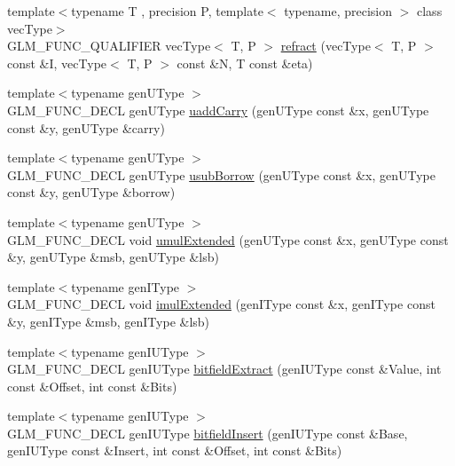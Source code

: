 \begin{DoxyCompactItemize}
\item 
{\footnotesize template$<$typename T , precision P, template$<$ typename, precision $>$ class vec\-Type$>$ }\\G\-L\-M\-\_\-\-F\-U\-N\-C\-\_\-\-Q\-U\-A\-L\-I\-F\-I\-E\-R vec\-Type$<$ T, P $>$ \hyperlink{group__core__func__geometric_ga99d8ddb244b129892babaca9778206d0}{refract} (vec\-Type$<$ T, P $>$ const \&I, vec\-Type$<$ T, P $>$ const \&N, T const \&eta)
\item 
{\footnotesize template$<$typename gen\-U\-Type $>$ }\\G\-L\-M\-\_\-\-F\-U\-N\-C\-\_\-\-D\-E\-C\-L gen\-U\-Type \hyperlink{group__core__func__integer_ga19276bb7adbe9f0d74515ae49e40b481}{uadd\-Carry} (gen\-U\-Type const \&x, gen\-U\-Type const \&y, gen\-U\-Type \&carry)
\item 
{\footnotesize template$<$typename gen\-U\-Type $>$ }\\G\-L\-M\-\_\-\-F\-U\-N\-C\-\_\-\-D\-E\-C\-L gen\-U\-Type \hyperlink{group__core__func__integer_gae5b4a6cefd1e21fd2e1b8526b4c964a7}{usub\-Borrow} (gen\-U\-Type const \&x, gen\-U\-Type const \&y, gen\-U\-Type \&borrow)
\item 
{\footnotesize template$<$typename gen\-U\-Type $>$ }\\G\-L\-M\-\_\-\-F\-U\-N\-C\-\_\-\-D\-E\-C\-L void \hyperlink{group__core__func__integer_gad991bf53779a4309a920bb7bfcf2639c}{umul\-Extended} (gen\-U\-Type const \&x, gen\-U\-Type const \&y, gen\-U\-Type \&msb, gen\-U\-Type \&lsb)
\item 
{\footnotesize template$<$typename gen\-I\-Type $>$ }\\G\-L\-M\-\_\-\-F\-U\-N\-C\-\_\-\-D\-E\-C\-L void \hyperlink{group__core__func__integer_ga7d284e3ea5059cae9fe8f0fe1a76dd02}{imul\-Extended} (gen\-I\-Type const \&x, gen\-I\-Type const \&y, gen\-I\-Type \&msb, gen\-I\-Type \&lsb)
\item 
{\footnotesize template$<$typename gen\-I\-U\-Type $>$ }\\G\-L\-M\-\_\-\-F\-U\-N\-C\-\_\-\-D\-E\-C\-L gen\-I\-U\-Type \hyperlink{group__core__func__integer_ga251d309beb171bf95117d2c301b2ad8b}{bitfield\-Extract} (gen\-I\-U\-Type const \&Value, int const \&Offset, int const \&Bits)
\item 
{\footnotesize template$<$typename gen\-I\-U\-Type $>$ }\\G\-L\-M\-\_\-\-F\-U\-N\-C\-\_\-\-D\-E\-C\-L gen\-I\-U\-Type \hyperlink{group__core__func__integer_ga7ab09972d52094d97d2480982e657dd0}{bitfield\-Insert} (gen\-I\-U\-Type const \&Base, gen\-I\-U\-Type const \&Insert, int const \&Offset, int const \&Bits)

\end{DoxyCompactItemize}
